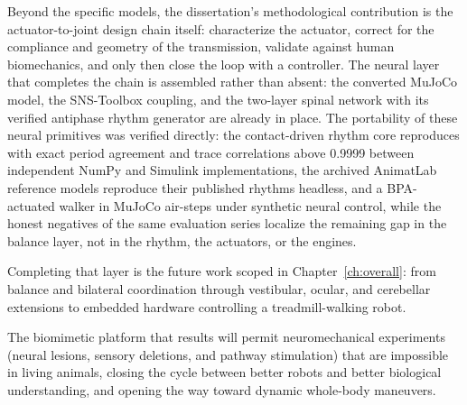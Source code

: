 Beyond the specific models, the dissertation's methodological contribution is the actuator-to-joint design chain itself: characterize the actuator, correct for the compliance and geometry of the transmission, validate against human biomechanics, and only then close the loop with a controller. The neural layer that completes the chain is assembled rather than absent: the converted MuJoCo model, the SNS-Toolbox coupling, and the two-layer spinal network with its verified antiphase rhythm generator are already in place. The portability of these neural primitives was verified directly: the contact-driven rhythm core reproduces with exact period agreement and trace correlations above 0.9999 between independent NumPy and Simulink implementations, the archived AnimatLab reference models reproduce their published rhythms headless, and a BPA-actuated walker in MuJoCo air-steps under synthetic neural control, while the honest negatives of the same evaluation series localize the remaining gap in the balance layer, not in the rhythm, the actuators, or the engines.

Completing that layer is the future work scoped in Chapter~\ref{ch:overall}: from balance and bilateral coordination through vestibular, ocular, and cerebellar extensions to embedded hardware controlling a treadmill-walking robot.

The biomimetic platform that results will permit neuromechanical experiments (neural lesions, sensory deletions, and pathway stimulation) that are impossible in living animals, closing the cycle between better robots and better biological understanding, and opening the way toward dynamic whole-body maneuvers.


